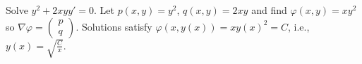 \begin{example}
    Solve \(y^2 + 2xyy' = 0\).
    Let \(p(x,y) = y^2\), \(q(x,y) = 2xy\) and find \(\varphi(x,y) = xy^2\) so \(\nabla \varphi = \left(\begin{smallmatrix}
            p\\ q
        \end{smallmatrix}\right)\).
    Solutions satisfy \(\varphi(x,y(x))= x {y(x)}^2 =C\), i.e., \(y(x) = \sqrt{\frac{C}{x}}\).
\end{example}